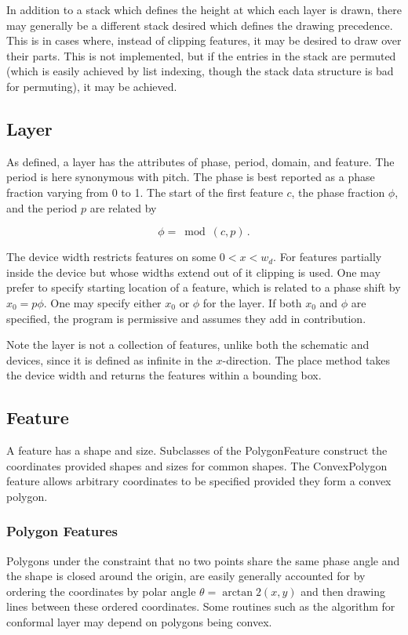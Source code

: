 \documentclass{article}
\begin{document}
In addition to a stack which defines the height at which each layer is drawn, there may generally be a different stack desired which defines the drawing precedence. This is in cases where, instead of clipping features, it may be desired to draw over their parts. This is not implemented, but if the entries in the stack are permuted (which is easily achieved by list indexing, though the stack data structure is bad for permuting), it may be achieved.

\subsection{Layer}

As defined, a layer has the attributes of phase, period, domain, and feature. The period is here synonymous with pitch. The phase is best reported as a phase fraction varying from 0 to 1. The start of the first feature $c$, the phase fraction $\phi$, and the period $p$ are related by

$$ \phi = \bmod(c, p) \,.$$

The device width restricts features on some $0 < x < w_d$. For features partially inside the device but whose widths extend out of it clipping is used. One may prefer to specify starting location of a feature, which is related to a phase shift by $x_0 = p \phi$. One may specify either $x_0$ or $\phi$ for the layer. If both $x_0$ and $\phi$ are specified, the program is permissive and assumes they add in contribution.

Note the layer is not a collection of features, unlike both the schematic and devices, since it is defined as infinite in the $x$-direction. The place method takes the device width and returns the features within a bounding box.

\subsection{Feature}

A feature has a shape and size. Subclasses of the PolygonFeature construct the coordinates provided shapes and sizes for common shapes. The ConvexPolygon feature allows arbitrary coordinates to be specified provided they form a convex polygon. 

\subsubsection{Polygon Features}
Polygons under the constraint that no two points share the same phase angle and the shape is closed around the origin, are easily generally accounted for by ordering the coordinates by polar angle $\theta = \arctan2(x,y)$ and then drawing lines between these ordered coordinates. Some routines such as the algorithm for conformal layer may depend on polygons being convex.
\end{document}
